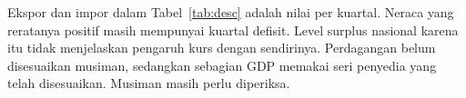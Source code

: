 \begin{table}[!htbp]\centering
\caption{Statistik sampel estimasi agregat Indonesia, 2011Q1--2026Q1}
\label{tab:desc}
\end{table}

Ekspor dan impor dalam Tabel~\ref{tab:desc} adalah nilai per kuartal. Neraca yang reratanya positif masih mempunyai kuartal defisit. Level surplus nasional karena itu tidak menjelaskan pengaruh kurs dengan sendirinya. Perdagangan belum disesuaikan musiman, sedangkan sebagian GDP memakai seri penyedia yang telah disesuaikan. Musiman masih perlu diperiksa.
